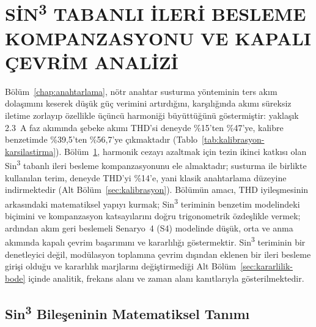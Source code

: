 \chapter{SİN\texorpdfstring{\textsuperscript{3}}{3} TABANLI İLERİ BESLEME KOMPANZASYONU VE KAPALI ÇEVRİM ANALİZİ}
\label{chap:sin3}

Bölüm~\ref{chap:anahtarlama}, nötr anahtar susturma yönteminin ters akım dolaşımını keserek düşük güç verimini artırdığını, karşılığında akımı süreksiz iletime zorlayıp özellikle üçüncü harmoniği büyüttüğünü göstermiştir: yaklaşık \SI{2.3}{\ampere} faz akımında şebeke akımı THD'si deneyde \%15'ten \%47'ye, kalibre benzetimde \%39,5'ten \%56,7'ye çıkmaktadır (Tablo~\ref{tab:kalibrasyon-karsilastirma}). Bölüm~\ref{chap:sin3}, harmonik cezayı azaltmak için tezin ikinci katkısı olan Sin\textsuperscript{3} tabanlı ileri besleme kompanzasyonunu ele almaktadır; susturma ile birlikte kullanılan terim, deneyde THD'yi \%14'e, yani klasik anahtarlama düzeyine indirmektedir (Alt Bölüm~\ref{sec:kalibrasyon}). Bölümün amacı, THD iyileşmesinin arkasındaki matematiksel yapıyı kurmak; Sin\textsuperscript{3} teriminin benzetim modelindeki biçimini ve kompanzasyon katsayılarını doğru trigonometrik özdeşlikle vermek; ardından akım geri beslemeli Senaryo~4 (S4) modelinde düşük, orta ve anma akımında kapalı çevrim başarımını ve kararlılığı göstermektir. Sin\textsuperscript{3} teriminin bir denetleyici değil, modülasyon toplamına çevrim dışından eklenen bir ileri besleme girişi olduğu ve kararlılık marjlarını değiştirmediği Alt Bölüm~\ref{sec:kararlilik-bode} içinde analitik, frekans alanı ve zaman alanı kanıtlarıyla gösterilmektedir.

\section{Sin\texorpdfstring{\textsuperscript{3}}{3} Bileşeninin Matematiksel Tanımı}

